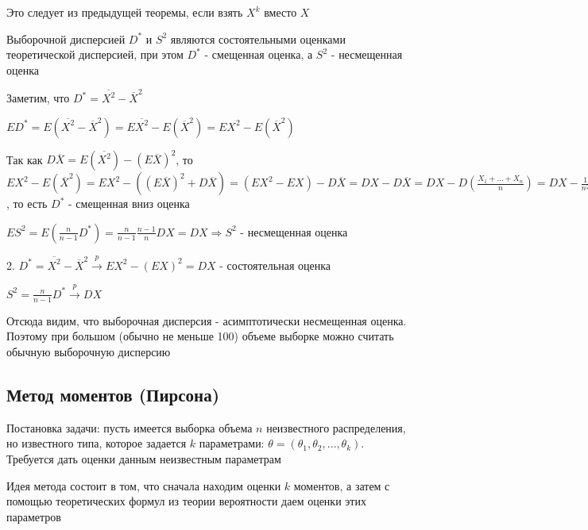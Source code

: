 \documentclass[12pt]{article}
\begin{document}
Это следует из предыдущей теоремы, если взять $X^k$ вместо $X$

\begin{MyTheorem}
    \Ths Выборочной дисперсией $D^*$ и $S^2$ являются состоятельными оценками теоретической дисперсией, при этом $D^*$ - смещенная оценка, а
    $S^2$ - несмещенная оценка
\end{MyTheorem}

\begin{MyProof}
    Заметим, что $D^* = \overline{X^2} - \overline{X}^2$

    $E D^* = E(\overline{X^2} - \overline{X}^2) = E\overline{X^2} - E (\overline{X}^2) = 
    E X^2 - E (\overline{X}^2)$

    Так как $D \overline{X} = E(\overline{X^2}) - (E \overline{X})^2$, то $E X^2 - E (\overline{X}^2) = 
    E X^2 - ((E\overline{X})^2 + D\overline{X}) = (E X^2 - EX) - D\overline{X} = D X - D \overline{X} = D X - D \left(\frac{X_1 + \dots + X_n}{n}\right) = 
    DX - \frac{1}{n^2} \sum_{i = 1}^n D X_i = DX - \frac{1}{n^2} n D X_1 = DX - \frac{1}{n} DX = \frac{n - 1}{n} DX$, то есть $D^*$ - смещенная вниз оценка

    $E S^2 = E(\frac{n}{n - 1} D^*) = \frac{n}{n - 1} \frac{n - 1}{n} DX = DX \Longrightarrow S^2$ - несмещенная оценка 

    2. $D^* = \overline{X^2} - \overline{X}^2 \overset{p}{\longrightarrow} E X^2 - (E X)^2 = DX$ - состоятельная оценка

    $S^2 = \frac{n}{n - 1} D^* \overset{p}{\longrightarrow} DX$
\end{MyProof}

\Nota Отсюда видим, что выборочная дисперсия - асимптотически несмещенная оценка. Поэтому при большом (обычно не меньше 100) объеме выборке можно
считать обычную выборочную дисперсию

\subsection{Метод моментов (Пирсона)}

Постановка задачи: пусть имеется выборка объема $n$ неизвестного распределения, но известного типа,
которое задается $k$ параметрами: $\theta = (\theta_1, \theta_2, \dots, \theta_k)$. Требуется дать оценки данным
неизвестным параметрам

Идея метода состоит в том, что сначала находим оценки $k$ моментов, а затем с помощью теоретических формул
из теории вероятности даем оценки этих параметров
\end{document}
